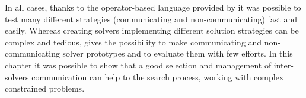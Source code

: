 In all cases, thanks to the operator-based language provided by \posl{} it was possible to test many different strategies (communicating and non-communicating) fast and easily. Whereas creating solvers implementing different solution strategies can be complex and tedious, \posl{} gives the possibility to make communicating and non-communicating solver prototypes and to evaluate them with few efforts. In this chapter it was possible to show that a good selection and management of inter-solvers communication can %
help to the search process, working with complex constrained problems.
